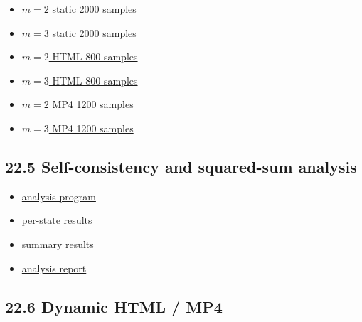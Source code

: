 \documentclass[
  a4paper,
]{article}
\providecommand{\tightlist}{%
  \setlength{\itemsep}{0pt}\setlength{\parskip}{0pt}}
\begin{document}
\begin{itemize}
\tightlist
\item
  \href{reproducibility_raw_readout_20260915/raw_data/wave_samples_static_2000_m2.csv}{\(m=2\)
  static 2000 samples}
\item
  \href{reproducibility_raw_readout_20260915/raw_data/wave_samples_static_2000_m3.csv}{\(m=3\)
  static 2000 samples}
\item
  \href{reproducibility_raw_readout_20260915/raw_data/wave_samples_html_800_m2.csv}{\(m=2\)
  HTML 800 samples}
\item
  \href{reproducibility_raw_readout_20260915/raw_data/wave_samples_html_800_m3.csv}{\(m=3\)
  HTML 800 samples}
\item
  \href{reproducibility_raw_readout_20260915/raw_data/wave_samples_mp4_1200_m2.csv}{\(m=2\)
  MP4 1200 samples}
\item
  \href{reproducibility_raw_readout_20260915/raw_data/wave_samples_mp4_1200_m3.csv}{\(m=3\)
  MP4 1200 samples}
\end{itemize}

\subsection{22.5 Self-consistency and squared-sum
analysis}\label{self-consistency-and-squared-sum-analysis}

\begin{itemize}
\tightlist
\item
  \href{reproducibility_raw_readout_20260915/self_consistency_square_sum_U4_20260915/analyze_K4_self_consistency_square_sum_20260915.py}{analysis
  program}
\item
  \href{reproducibility_raw_readout_20260915/self_consistency_square_sum_U4_20260915/K4_self_consistency_square_sum_by_state_20260915.csv}{per-state
  results}
\item
  \href{reproducibility_raw_readout_20260915/self_consistency_square_sum_U4_20260915/K4_self_consistency_square_sum_summary_20260915.csv}{summary
  results}
\item
  \href{reproducibility_raw_readout_20260915/self_consistency_square_sum_U4_20260915/K4_self_consistency_square_sum_analysis_20260915.md}{analysis
  report}
\end{itemize}

\subsection{22.6 Dynamic HTML / MP4}\label{dynamic-html-mp4}
\end{document}
